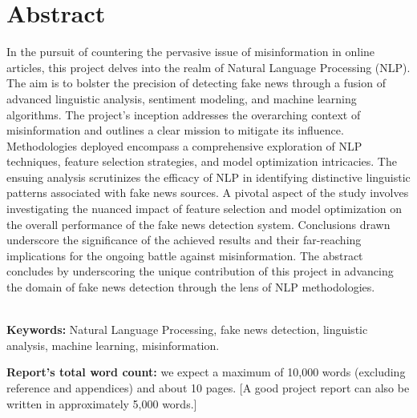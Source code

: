 \chapter*{\center \Large  Abstract}

In the pursuit of countering the pervasive issue of misinformation in online articles, this project delves into the realm of Natural Language Processing (NLP). The aim is to bolster the precision of detecting fake news through a fusion of advanced linguistic analysis, sentiment modeling, and machine learning algorithms. The project's inception addresses the overarching context of misinformation and outlines a clear mission to mitigate its influence. Methodologies deployed encompass a comprehensive exploration of NLP techniques, feature selection strategies, and model optimization intricacies. The ensuing analysis scrutinizes the efficacy of NLP in identifying distinctive linguistic patterns associated with fake news sources. A pivotal aspect of the study involves investigating the nuanced impact of feature selection and model optimization on the overall performance of the fake news detection system. Conclusions drawn underscore the significance of the achieved results and their far-reaching implications for the ongoing battle against misinformation. The abstract concludes by underscoring the unique contribution of this project in advancing the domain of fake news detection through the lens of NLP methodologies. 


~\\[1cm]
\noindent %
\textbf{Keywords:} Natural Language Processing, fake news detection, linguistic analysis, machine learning, misinformation. 

\vfill
\noindent
\textbf{Report's total word count:} we expect a maximum of 10,000 words (excluding reference and appendices) and about 10 pages. [A good project report can also be written in approximately 5,000 words.]

